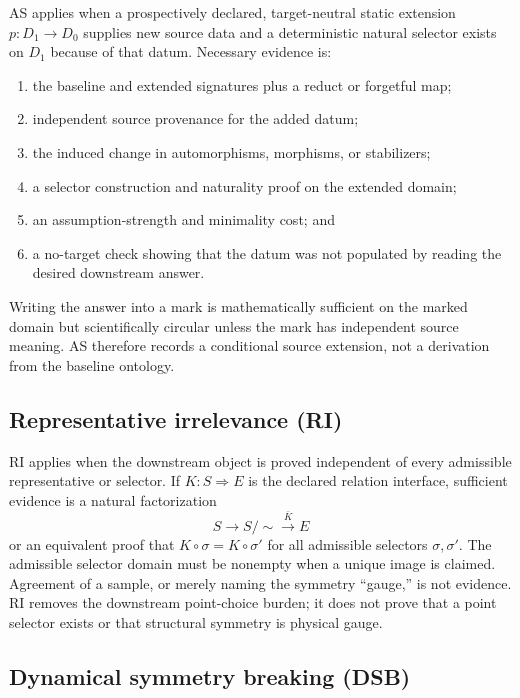 \documentclass[11pt]{article}
\begin{document}
AS applies when a prospectively declared, target-neutral static extension
$p:D_1\to D_0$ supplies new source data and a deterministic natural selector
exists on $D_1$ because of that datum.  Necessary evidence is:
\begin{enumerate}[label=AS\arabic*.]
  \item the baseline and extended signatures plus a reduct or forgetful map;
  \item independent source provenance for the added datum;
  \item the induced change in automorphisms, morphisms, or stabilizers;
  \item a selector construction and naturality proof on the extended domain;
  \item an assumption-strength and minimality cost; and
  \item a no-target check showing that the datum was not populated by reading
        the desired downstream answer.
\end{enumerate}
Writing the answer into a mark is mathematically sufficient on the marked
domain but scientifically circular unless the mark has independent source
meaning.  AS therefore records a conditional source extension, not a
derivation from the baseline ontology.

\subsection{Representative irrelevance (RI)}

RI applies when the downstream object is proved independent of every
admissible representative or selector.  If $K:S\Rightarrow E$ is the declared
relation interface, sufficient evidence is a natural factorization
\[
  S\longrightarrow S/{\sim}\xrightarrow{\bar K}E
\]
or an equivalent proof that $K\circ\sigma=K\circ\sigma'$ for all admissible
selectors $\sigma,\sigma'$.  The admissible selector domain must be nonempty
when a unique image is claimed.  Agreement of a sample, or merely naming the
symmetry ``gauge,'' is not evidence.  RI removes the downstream point-choice
burden; it does not prove that a point selector exists or that structural
symmetry is physical gauge.

\subsection{Dynamical symmetry breaking (DSB)}
\end{document}
